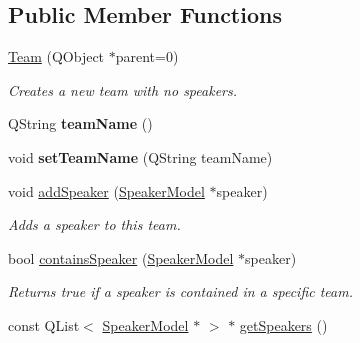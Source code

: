 \subsection*{Public Member Functions}
\begin{DoxyCompactItemize}
\item 
\hypertarget{classTeam_afac346a2380d0c8d44e036f3546724fd}{\hyperlink{classTeam_afac346a2380d0c8d44e036f3546724fd}{Team} (Q\-Object $\ast$parent=0)}\label{classTeam_afac346a2380d0c8d44e036f3546724fd}

\begin{DoxyCompactList}\small\item\em Creates a new team with no speakers. \end{DoxyCompactList}\item 
\hypertarget{classTeam_a5580d0af7691668b06f8b12e36f256ae}{Q\-String {\bfseries team\-Name} ()}\label{classTeam_a5580d0af7691668b06f8b12e36f256ae}

\item 
\hypertarget{classTeam_a1ea161f9bcc465d45a8ca2603590739e}{void {\bfseries set\-Team\-Name} (Q\-String team\-Name)}\label{classTeam_a1ea161f9bcc465d45a8ca2603590739e}

\item 
\hypertarget{classTeam_a119572f6c2b161793e6e0142eaaa6662}{void \hyperlink{classTeam_a119572f6c2b161793e6e0142eaaa6662}{add\-Speaker} (\hyperlink{classSpeakerModel}{Speaker\-Model} $\ast$speaker)}\label{classTeam_a119572f6c2b161793e6e0142eaaa6662}

\begin{DoxyCompactList}\small\item\em Adds a speaker to this team. \end{DoxyCompactList}\item 
\hypertarget{classTeam_a4498bf1abc95c7ac84317e3c0ab1f5ac}{bool \hyperlink{classTeam_a4498bf1abc95c7ac84317e3c0ab1f5ac}{contains\-Speaker} (\hyperlink{classSpeakerModel}{Speaker\-Model} $\ast$speaker)}\label{classTeam_a4498bf1abc95c7ac84317e3c0ab1f5ac}

\begin{DoxyCompactList}\small\item\em Returns {\ttfamily true} if a speaker is contained in a specific team. \end{DoxyCompactList}\item 
\hypertarget{classTeam_a59ac03f8a3f9448b20bfd16c2ad64f04}{const Q\-List$<$ \hyperlink{classSpeakerModel}{Speaker\-Model} $\ast$ $>$ $\ast$ \hyperlink{classTeam_a59ac03f8a3f9448b20bfd16c2ad64f04}{get\-Speakers} ()}\label{classTeam_a59ac03f8a3f9448b20bfd16c2ad64f04}


\end{DoxyCompactItemize}
